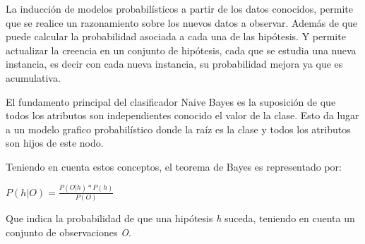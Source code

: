 La inducción de modelos probabilísticos a partir de los datos conocidos, permite que se realice un razonamiento sobre los nuevos datos a observar. Además de que puede calcular la probabilidad asociada a cada una de las hipótesis. Y permite actualizar la creencia en un conjunto de hipótesis, cada que se estudia una nueva instancia, es decir con cada nueva instancia, su probabilidad mejora ya que es acumulativa\cite{key-230}.

El fundamento principal del clasificador Naive Bayes es la suposición de que todos los atributos son independientes conocido el valor de la clase. Esto da lugar a un modelo grafico probabilístico donde la raíz es la clase y todos los atributos son hijos de este nodo.

Teniendo en cuenta estos conceptos, el teorema de Bayes es representado por:
\begin{center}
$P(h|O)=\frac{P(O|h)*P(h)}{P(O)}$
\end{center}
Que indica la probabilidad de que una hipótesis \emph{h} suceda, teniendo en cuenta un conjunto de observaciones \emph{O}.

